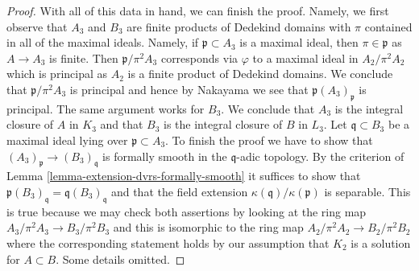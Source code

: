 \begin{proof}
\medskip\noindent
With all of this data in hand, we can finish the proof. Namely, we
first observe that $A_3$ and $B_3$ are finite products of
Dedekind domains with $\pi$ contained in all of the maximal ideals.
Namely, if $\mathfrak p \subset A_3$ is a maximal ideal, then
$\pi \in \mathfrak p$ as $A \to A_3$ is finite. Then $\mathfrak p/\pi^2 A_3$
corresponds via $\varphi$ to a maximal ideal in $A_2 / \pi^2A_2$
which is principal as $A_2$ is a finite product of Dedekind domains.
We conclude that $\mathfrak p/\pi^2 A_3$ is principal and hence by Nakayama 
we see that $\mathfrak p (A_3)_\mathfrak p$ is principal.
The same argument works for $B_3$. We conclude that
$A_3$ is the integral closure of $A$ in $K_3$
and that $B_3$ is the integral closure of $B$ in $L_3$.
Let $\mathfrak q \subset B_3$ be a maximal ideal lying
over $\mathfrak p \subset A_3$. To finish the proof we have
to show that $(A_3)_\mathfrak p \to (B_3)_\mathfrak q$ is
formally smooth in the $\mathfrak q$-adic topology. By the criterion of
Lemma \ref{lemma-extension-dvrs-formally-smooth} it suffices to show that
$\mathfrak p (B_3)_\mathfrak q = \mathfrak q (B_3)_\mathfrak q$
and that the field extension $\kappa(\mathfrak q)/\kappa(\mathfrak p)$
is separable. This is true because we may check both assertions
by looking at the ring map $A_3/\pi^2 A_3 \to B_3/\pi^2 B_3$
and this is isomorphic to the ring map
$A_2/\pi^2 A_2 \to B_2/\pi^2 B_2$ where the corresponding
statement holds by our assumption that $K_2$
is a solution for $A \subset B$. Some details omitted.
\end{proof}
